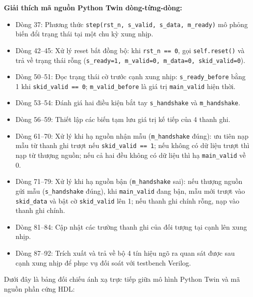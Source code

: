 \textbf{Giải thích mã nguồn Python Twin dòng-từng-dòng:}
\begin{itemize}[leftmargin=1.5em, itemsep=2pt]
    \item Dòng 37: Phương thức \texttt{step(rst\_n, s\_valid, s\_data, m\_ready)} mô phỏng biến đổi trạng thái tại một chu kỳ xung nhịp.
    \item Dòng 42--45: Xử lý reset bất đồng bộ: khi \texttt{rst\_n == 0}, gọi \texttt{self.reset()} và trả về trạng thái rỗng (\texttt{s\_ready=1, m\_valid=0, m\_data=0, skid\_valid=0}).
    \item Dòng 50--51: Đọc trạng thái cờ trước cạnh xung nhịp: \texttt{s\_ready\_before} bằng 1 khi \texttt{skid\_valid == 0}; \texttt{m\_valid\_before} là giá trị \texttt{main\_valid} hiện thời.
    \item Dòng 53--54: Đánh giá hai điều kiện bắt tay \texttt{s\_handshake} và \texttt{m\_handshake}.
    \item Dòng 56--59: Thiết lập các biến tạm lưu giá trị kế tiếp của 4 thanh ghi.
    \item Dòng 61--70: Xử lý khi hạ nguồn nhận mẫu (\texttt{m\_handshake} đúng): ưu tiên nạp mẫu từ thanh ghi trượt nếu \texttt{skid\_valid == 1}; nếu không có dữ liệu trượt thì nạp từ thượng nguồn; nếu cả hai đều không có dữ liệu thì hạ \texttt{main\_valid} về 0.
    \item Dòng 71--79: Xử lý khi hạ nguồn bận (\texttt{m\_handshake} sai): nếu thượng nguồn gửi mẫu (\texttt{s\_handshake} đúng), khi \texttt{main\_valid} đang bận, mẫu mới trượt vào \texttt{skid\_data} và bật cờ \texttt{skid\_valid} lên 1; nếu thanh ghi chính rỗng, nạp vào thanh ghi chính.
    \item Dòng 81--84: Cập nhật các trường thanh ghi của đối tượng tại cạnh lên xung nhịp.
    \item Dòng 87--92: Trích xuất và trả về bộ 4 tín hiệu ngõ ra quan sát được sau cạnh xung nhịp để phục vụ đối soát với testbench Verilog.
\end{itemize}

Dưới đây là bảng đối chiếu ánh xạ trực tiếp giữa mô hình Python Twin và mã nguồn phần cứng HDL:

